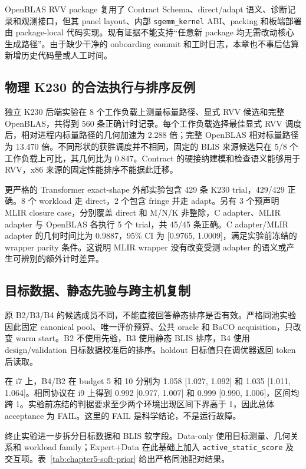 OpenBLAS RVV package 复用了 Contract Schema、direct/adapt 语义、诊断记录和观测接口，但其 panel layout、内部 \texttt{sgemm\_kernel} ABI、packing 和板端部署由 package-local 代码实现。现有证据不能支持“任意新 package 均无需改动核心生成路径”。由于缺少干净的 onboarding commit 和工时日志，本章也不事后估算新增历史代码量或人工时间。

\subsection{物理 K230 的合法执行与排序反例}

独立 K230 后端实验在 8 个工作负载上测量标量路径、显式 RVV 候选和完整 OpenBLAS，共得到 560 条正确计时记录。每个工作负载选择最佳显式 RVV 调度后，相对进程内标量路径的几何加速为 2.288 倍；完整 OpenBLAS 相对标量路径为 13.470 倍。不同形状的获胜调度并不相同，固定的 BLIS 来源候选只在 5/8 个工作负载上可比，其几何比为 0.847。Contract 的硬接纳建模和检查语义能够用于 RVV，x86 来源的固定性能排序不能据此迁移。

更严格的 Transformer exact-shape 外部实验包含 429 条 K230 trial，429/429 正确。8 个 workload 走 direct，2 个包含 fringe 并走 adapt。另有 3 个预声明 MLIR closure case，分别覆盖 direct 和 M/N/K 非整除，C adapter、MLIR adapter 与 OpenBLAS 各执行 5 个 trial，共 45/45 条正确。C adapter/MLIR adapter 的几何时间比为 0.9887，95\% CI 为 [0.9765, 1.0009]，满足实验前冻结的 wrapper parity 条件。这说明 MLIR wrapper 没有改变受测 adapter 的语义或产生可辨别的额外计时差异。

\subsection{目标数据、静态先验与跨主机复制}
\label{subsec:chapter5-soft-prior}

原 B2/B3/B4 的候选成员不同，不能直接回答静态排序是否有效。严格同池实验因此固定 canonical pool、唯一评价预算、公共 oracle 和 BaCO acquisition，只改变 warm start。B2 不使用先验，B3 使用静态 BLIS 排序，B4 使用 design/validation 目标数据校准后的排序。holdout 目标值只在调优器返回 token 后读取。

在 i7 上，B4/B2 在 budget 5 和 10 分别为 1.058 [1.027, 1.092] 和 1.035 [1.011, 1.064]。相同协议在 i9 上得到 0.992 [0.977, 1.007] 和 0.999 [0.990, 1.006]，区间均跨 1。实验前冻结的判据要求至少两个环境出现区间下界高于 1，因此总体 acceptance 为 FAIL。这里的 FAIL 是科学结论，不是运行故障。

终止实验进一步拆分目标数据和 BLIS 软字段。Data-only 使用目标测量、几何关系和 workload family；Expert+Data 在此基础上加入 \texttt{active\_static\_score} 及交互项。表~\ref{tab:chapter5-soft-prior} 给出严格同池配对结果。

